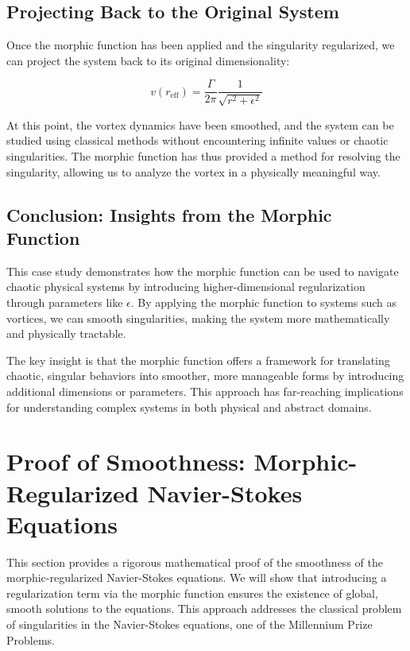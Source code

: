 \documentclass{article}
\begin{document}
\subsection*{Projecting Back to the Original System}

Once the morphic function has been applied and the singularity regularized, we can project the system back to its original dimensionality:

\[
v(r_{\text{eff}}) = \frac{\Gamma}{2\pi} \frac{1}{\sqrt{r^2 + \epsilon^2}}
\]

At this point, the vortex dynamics have been smoothed, and the system can be studied using classical methods without encountering infinite values or chaotic singularities. The morphic function has thus provided a method for resolving the singularity, allowing us to analyze the vortex in a physically meaningful way.

\subsection*{Conclusion: Insights from the Morphic Function}

This case study demonstrates how the morphic function can be used to navigate chaotic physical systems by introducing higher-dimensional regularization through parameters like \( \epsilon \). By applying the morphic function to systems such as vortices, we can smooth singularities, making the system more mathematically and physically tractable.

The key insight is that the morphic function offers a framework for translating chaotic, singular behaviors into smoother, more manageable forms by introducing additional dimensions or parameters. This approach has far-reaching implications for understanding complex systems in both physical and abstract domains.

\section*{Proof of Smoothness: Morphic-Regularized Navier-Stokes Equations}

This section provides a rigorous mathematical proof of the smoothness of the morphic-regularized Navier-Stokes equations. We will show that introducing a regularization term via the morphic function ensures the existence of global, smooth solutions to the equations. This approach addresses the classical problem of singularities in the Navier-Stokes equations, one of the Millennium Prize Problems.
\end{document}
